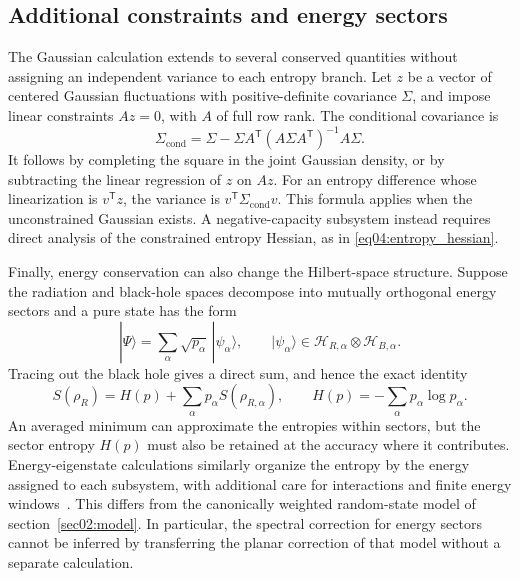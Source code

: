 \documentclass[11pt,letterpaper]{article}
\theoremstyle{plain}
\theoremstyle{definition}
\theoremstyle{remark}
\begin{document}
\subsection{Additional constraints and energy sectors}

The Gaussian calculation extends to several conserved quantities without assigning an independent variance to each entropy branch. Let $z$ be a vector of centered Gaussian fluctuations with positive-definite covariance $\Sigma$, and impose linear constraints $Az=0$, with $A$ of full row rank. The conditional covariance is
\begin{equation}
 \Sigma_{\mathrm{cond}}
 =\Sigma-\Sigma A^{\mathsf T}
 (A\Sigma A^{\mathsf T})^{-1}A\Sigma.
 \label{eq04:conditional_covariance}
\end{equation}
It follows by completing the square in the joint Gaussian density, or by subtracting the linear regression of $z$ on $Az$. For an entropy difference whose linearization is $v^{\mathsf T}z$, the variance is $v^{\mathsf T}\Sigma_{\mathrm{cond}}v$. This formula applies when the unconstrained Gaussian exists. A negative-capacity subsystem instead requires direct analysis of the constrained entropy Hessian, as in \eqref{eq04:entropy_hessian}.

Finally, energy conservation can also change the Hilbert-space structure. Suppose the radiation and black-hole spaces decompose into mutually orthogonal energy sectors and a pure state has the form
\begin{equation}
 |\Psi\rangle=\sum_\alpha\sqrt{p_\alpha}\,|\psi_\alpha\rangle,
 \qquad
 |\psi_\alpha\rangle\in
 \mathcal H_{R,\alpha}\otimes\mathcal H_{B,\alpha}.
 \label{eq04:energy_sector_state}
\end{equation}
Tracing out the black hole gives a direct sum, and hence the exact identity
\begin{equation}
 S(\rho_R)=H(p)+\sum_\alpha p_\alpha S(\rho_{R,\alpha}),
 \qquad H(p)=-\sum_\alpha p_\alpha\log p_\alpha.
 \label{eq04:block_entropy}
\end{equation}
An averaged minimum can approximate the entropies within sectors, but the sector entropy $H(p)$ must also be retained at the accuracy where it contributes. Energy-eigenstate calculations similarly organize the entropy by the energy assigned to each subsystem, with additional care for interactions and finite energy windows~\cite{murthysrednicki2019,dongwang2020}. This differs from the canonically weighted random-state model of section~\ref{sec02:model}. In particular, the spectral correction for energy sectors cannot be inferred by transferring the planar correction of that model without a separate calculation.
\end{document}
